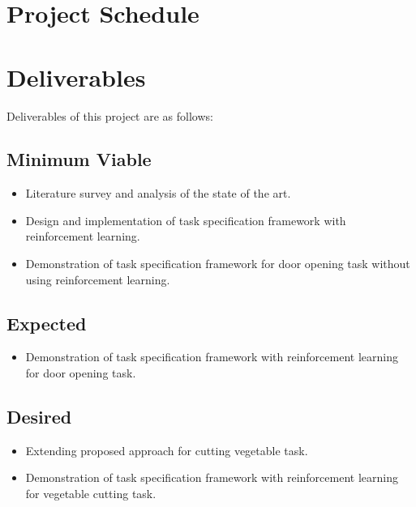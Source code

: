 \documentclass[thesis]{mas_proposal}
\begin{document}
\section{Project Schedule}



\section{Deliverables}
Deliverables of this project are as follows: 
\subsection{Minimum Viable}

\begin{itemize}
    \item Literature survey and analysis of the state of the art.
    \item Design and implementation of task specification framework with reinforcement learning.
    \item Demonstration of task specification framework for door opening task without using reinforcement learning.
\end{itemize}

\subsection{Expected}
\begin{itemize}
    \item Demonstration of task specification framework with reinforcement learning for door opening task.
\end{itemize}

\subsection{Desired}
\begin{itemize}
	\item Extending proposed approach for cutting vegetable task.
    \item Demonstration of task specification framework with reinforcement learning for vegetable cutting task.
\end{itemize}


\nocite{*}

\end{document}
